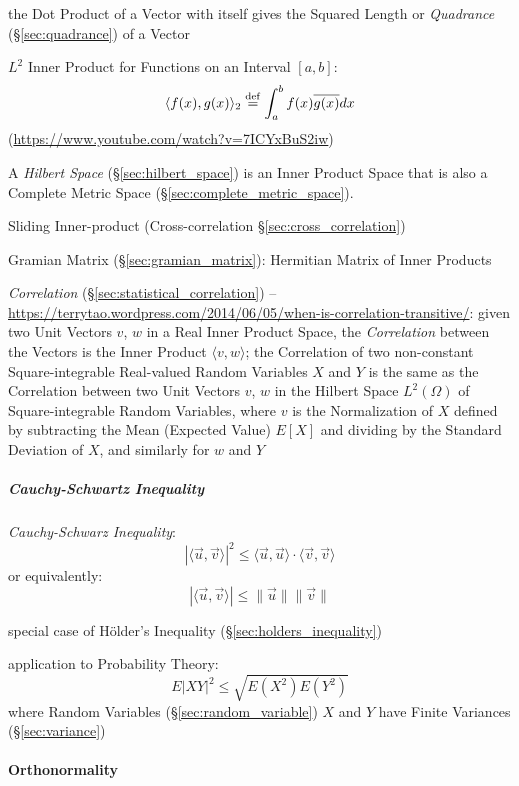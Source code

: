 the Dot Product of a Vector with itself gives the Squared Length or
\emph{Quadrance} (\S\ref{sec:quadrance}) of a Vector

$L^2$ Inner Product for Functions on an Interval $[a, b]$:
\[
  \langle{f(x), g(x)}\rangle_2 \stackrel{\mathrm{def}}= \int_a^b f(x) \overline{g(x)} dx
\]
(\url{https://www.youtube.com/watch?v=7ICYxBuS2iw})

A \emph{Hilbert Space} (\S\ref{sec:hilbert_space}) is an Inner Product Space
that is also a Complete Metric Space (\S\ref{sec:complete_metric_space}).

\fist Sliding Inner-product (Cross-correlation \S\ref{sec:cross_correlation})

\fist Gramian Matrix (\S\ref{sec:gramian_matrix}): Hermitian Matrix of Inner
Products

\emph{Correlation} (\S\ref{sec:statistical_correlation}) --
\url{https://terrytao.wordpress.com/2014/06/05/when-is-correlation-transitive/}:
given two Unit Vectors $v$, $w$ in a Real Inner Product Space, the
\emph{Correlation} between the Vectors is the Inner Product
$\langle{v,w}\rangle$; the Correlation of two non-constant Square-integrable
Real-valued Random Variables $X$ and $Y$ is the same as the Correlation between
two Unit Vectors $v$, $w$ in the Hilbert Space $L^2(\Omega)$ of
Square-integrable Random Variables, where $v$ is the Normalization of $X$
defined by subtracting the Mean (Expected Value) $E[X]$ and dividing by the
Standard Deviation of $X$, and similarly for $w$ and $Y$



\subparagraph{Cauchy-Schwartz Inequality}\label{sec:cauchy_schwarz}\hfill

\emph{Cauchy-Schwarz Inequality}:
\[
  |\langle{\vec{u},\vec{v}}\rangle|^2 \leq
    \langle{\vec{u},\vec{u}}\rangle \cdot \langle{\vec{v},\vec{v}}\rangle
\]
or equivalently:
\[
  |\langle{\vec{u},\vec{v}}\rangle| \leq \|\vec{u}\| \|\vec{v}\|
\]

special case of H\"older's Inequality (\S\ref{sec:holders_inequality})

application to Probability Theory:
\[
  E|XY|^2 \leq \sqrt{E(X^2)E(Y^2)}
\]
where Random Variables (\S\ref{sec:random_variable}) $X$ and $Y$ have Finite
Variances (\S\ref{sec:variance})



\paragraph{Orthonormality}\label{sec:orthonormality}\hfill


